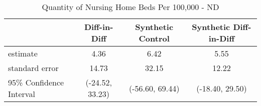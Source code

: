 \begin{table}[ht]
\centering
\begin{tabular}{lccc}
  \hline
 & Diff-in-Diff & Synthetic Control & Synthetic Diff-in-Diff \\ 
  \hline
estimate & 4.36 & 6.42 & 5.55 \\ 
  standard error & 14.73 & 32.15 & 12.22 \\ 
  95\% Confidence Interval & (-24.52, 33.23) & (-56.60, 69.44) & (-18.40, 29.50) \\ 
   \hline
\end{tabular}
\caption{Quantity of Nursing Home Beds Per 100,000 - ND} 
\end{table}
